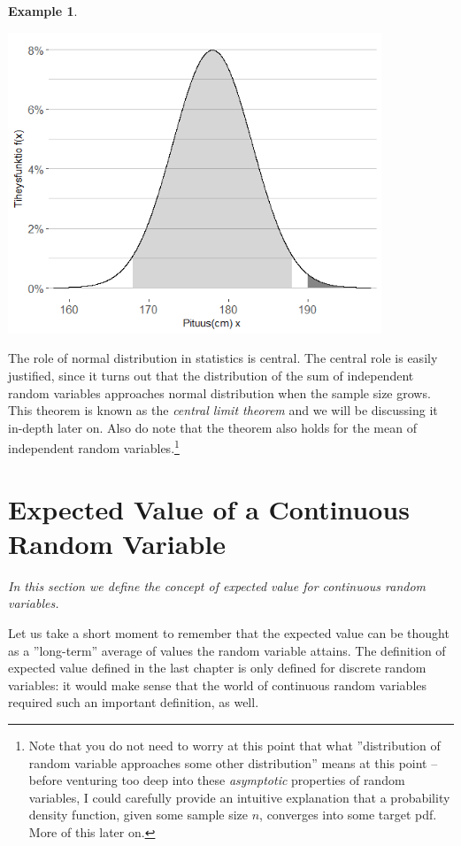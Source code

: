 \documentclass[12pt,a4paper,leqno]{report}
\theoremstyle{plain}
\theoremstyle{definition}
\newtheorem{esim}[equation]{Example}
\begin{document}
\begin{esim}
\begin{center}
\includegraphics[height = 9cm]{pituus.png}
\end{center}
\end{esim}

The role of normal distribution in statistics is central. The central role is easily justified, since it turns out that the distribution of the sum of independent random variables approaches normal distribution when the sample size grows. This theorem is known as the \emph{central limit theorem} and we will be discussing it in-depth later on. Also do note that the theorem also holds for the mean of independent random variables.\footnote{Note that you do not need to worry at this point that what ''distribution of random variable approaches some other distribution'' means at this point -- before venturing too deep into these \emph{asymptotic} properties of random variables, I could carefully provide an intuitive explanation that a probability density function, given some sample size $n$, converges into some target pdf. More of this later on.}
 
\section{Expected Value of a Continuous Random Variable}

\emph{In this section we define the concept of expected value for continuous random variables.}

Let us take a short moment to remember that the expected value can be thought as a ''long-term'' average of values the random variable attains. The definition of expected value defined in the last chapter is only defined for discrete random variables: it would make sense that the world of continuous random variables required such an important definition, as well.
\end{document}
